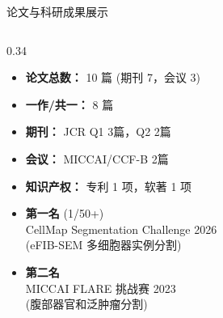 \documentclass[aspectratio=169, xcolor=table, 10pt]{beamer}
\begin{document}
\begin{frame}[shrink]{论文与科研成果展示}
    \begin{columns}[T]
        \begin{column}{0.34\textwidth}
            \begin{tcolorbox}[enhanced, colback=myblue!5!white, colframe=myblue!80!black, boxrule=0.5pt, arc=3pt, left=2pt, right=2pt, top=2pt, bottom=2pt, title=\textbf{\footnotesize \faChartBar\ 成果概览}]
                \scriptsize
                \begin{itemize}
                    \setlength\itemsep{0.5em}
                    \item \textbf{论文总数：} 10 篇 (期刊 7，会议 3)
                    \item \textbf{一作/共一：} 8 篇
                    \item \textbf{期刊：} JCR Q1 3篇，Q2 2篇
                    \item \textbf{会议：} MICCAI/CCF-B 2篇
                    \item \textbf{知识产权：} 专利 1 项，软著 1 项
                \end{itemize}
            \end{tcolorbox}
            
            \vspace{0.5em}
            
            \begin{tcolorbox}[enhanced, colback=myred!5!white, colframe=myred!80!black, boxrule=0.5pt, arc=3pt, left=2pt, right=2pt, top=2pt, bottom=2pt, title=\textbf{\footnotesize \faTrophy\ 竞赛荣誉}]
                \scriptsize
                \begin{itemize}
                    \setlength\itemsep{0.5em}
                    \item \textbf{第一名} (1/50+)\\
                    CellMap Segmentation Challenge 2026\\
                    \tiny{(eFIB-SEM 多细胞器实例分割)}
                    \item \textbf{第二名}\\
                    MICCAI FLARE 挑战赛 2023\\
                    \tiny{(腹部器官和泛肿瘤分割)}
                \end{itemize}
            \end{tcolorbox}
            
        \end{column}


\end{columns}
\end{frame}
\end{document}
